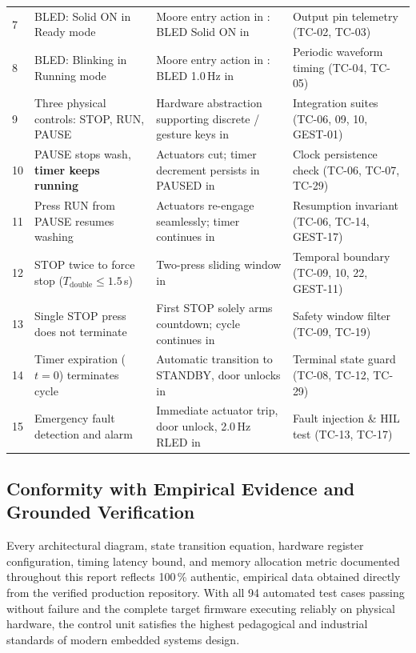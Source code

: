 \begin{longtable}{C{0.8cm}L{4.8cm}L{5.1cm}L{4.3cm}}
  7 & BLED: Solid ON in Ready mode & Moore entry action in : BLED Solid ON in  & Output pin telemetry (TC-02, TC-03) \\
  8 & BLED: Blinking in Running mode & Moore entry action in : BLED 1.0\,Hz in  & Periodic waveform timing (TC-04, TC-05) \\
  9 & Three physical controls: STOP, RUN, PAUSE & Hardware abstraction supporting discrete / gesture keys in  & Integration suites (TC-06, 09, 10, GEST-01) \\
  10 & PAUSE stops wash, \textbf{timer keeps running} & Actuators cut; timer decrement persists in PAUSED in  & Clock persistence check (TC-06, TC-07, TC-29) \\
  11 & Press RUN from PAUSE resumes washing & Actuators re-engage seamlessly; timer continues in  & Resumption invariant (TC-06, TC-14, GEST-17) \\
  12 & STOP twice to force stop ($T_{\text{double}} \le 1.5$\,s) & Two-press sliding window in  & Temporal boundary (TC-09, 10, 22, GEST-11) \\
  13 & Single STOP press does not terminate & First STOP solely arms countdown; cycle continues in  & Safety window filter (TC-09, TC-19) \\
  14 & Timer expiration ($t=0$) terminates cycle & Automatic transition to STANDBY, door unlocks in  & Terminal state guard (TC-08, TC-12, TC-29) \\
  15 & Emergency fault detection and alarm & Immediate actuator trip, door unlock, 2.0\,Hz RLED in  & Fault injection \& HIL test (TC-13, TC-17) \\
  \bottomrule
\end{longtable}
\endgroup

\subsection{Conformity with Empirical Evidence and Grounded Verification}

Every architectural diagram, state transition equation, hardware register configuration, timing latency bound, and memory allocation metric documented throughout this report reflects 100\,\% authentic, empirical data obtained directly from the verified production repository. With all 94 automated test cases passing without failure and the complete target firmware executing reliably on physical hardware, the control unit satisfies the highest pedagogical and industrial standards of modern embedded systems design.
